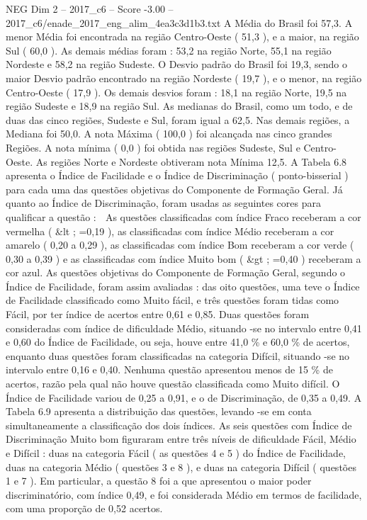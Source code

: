 \begin{textsample}{NEG Dim 2 – 2017\_c6 – Score -3.00 – 2017\_c6/enade\_2017\_eng\_alim\_4ea3c3d1b3.txt}
A Média do Brasil foi 57,3.
A menor Média foi encontrada na região Centro-Oeste ( 51,3 ), e a maior, na região Sul ( 60,0 ).
As demais médias foram : 53,2 na região Norte, 55,1 na região Nordeste e 58,2 na região Sudeste.
O Desvio padrão do Brasil foi 19,3, sendo o maior Desvio padrão encontrado na região Nordeste ( 19,7 ), e o menor, na região Centro-Oeste ( 17,9 ).
Os demais desvios foram : 18,1 na região Norte, 19,5 na região Sudeste e 18,9 na região Sul.
As medianas do Brasil, como um todo, e de duas das cinco regiões, Sudeste e Sul, foram igual a 62,5.
Nas demais regiões, a Mediana foi 50,0.
A nota Máxima ( 100,0 ) foi alcançada nas cinco grandes Regiões.
A nota mínima ( 0,0 ) foi obtida nas regiões Sudeste, Sul e Centro-Oeste.
As regiões Norte e Nordeste obtiveram nota Mínima 12,5.
A Tabela 6.8 apresenta o Índice de Facilidade e o Índice de Discriminação ( ponto-bisserial ) para cada uma das questões objetivas do Componente de Formação Geral.
Já quanto ao Índice de Discriminação, foram usadas as seguintes cores para qualificar a questão :  As questões classificadas com índice Fraco receberam a cor vermelha ( \&lt ; =0,19 ), as classificadas com índice Médio receberam a cor amarelo ( 0,20 a 0,29 ), as classificadas com índice Bom receberam a cor verde ( 0,30 a 0,39 ) e as classificadas com índice Muito bom ( \&gt ; =0,40 ) receberam a cor azul.
As questões objetivas do Componente de Formação Geral, segundo o Índice de Facilidade, foram assim avaliadas : das oito questões, uma teve o Índice de Facilidade classificado como Muito fácil, e três questões foram tidas como Fácil, por ter índice de acertos entre 0,61 e 0,85.
Duas questões foram consideradas com índice de dificuldade Médio, situando -se no intervalo entre 0,41 e 0,60 do Índice de Facilidade, ou seja, houve entre 41,0 \% e 60,0 \% de acertos, enquanto duas questões foram classificadas na categoria Difícil, situando -se no intervalo entre 0,16 e 0,40.
Nenhuma questão apresentou menos de 15 \% de acertos, razão pela qual não houve questão classificada como Muito difícil.
O Índice de Facilidade variou de 0,25 a 0,91, e o de Discriminação, de 0,35 a 0,49.
A Tabela 6.9 apresenta a distribuição das questões, levando -se em conta simultaneamente a classificação dos dois índices.
As seis questões com Índice de Discriminação Muito bom figuraram entre três níveis de dificuldade Fácil, Médio e Difícil : duas na categoria Fácil ( as questões 4 e 5 ) do Índice de Facilidade, duas na categoria Médio ( questões 3 e 8 ), e duas na categoria Difícil ( questões 1 e 7 ).
Em particular, a questão 8 foi a que apresentou o maior poder discriminatório, com índice 0,49, e foi considerada Médio em termos de facilidade, com uma proporção de 0,52 acertos.

\end{textsample}
